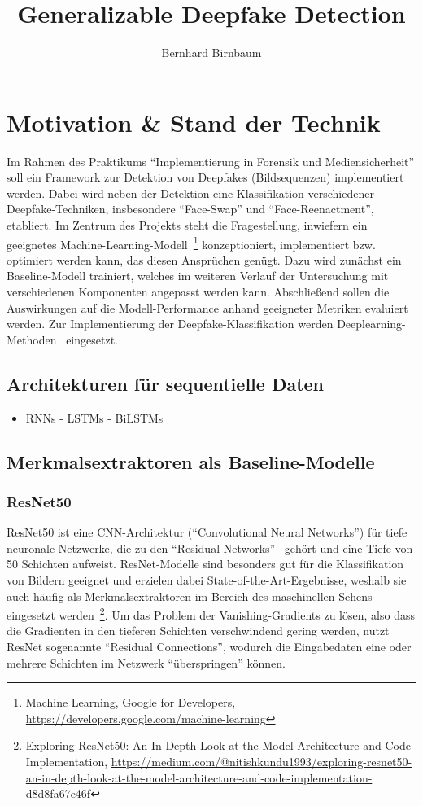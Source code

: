 \documentclass{article}
\title{Generalizable Deepfake Detection}
\author{Bernhard Birnbaum}
\begin{document}
    \maketitle

    \section{Motivation \& Stand der Technik}
    Im Rahmen des Praktikums \enquote{Implementierung in Forensik und Mediensicherheit} soll ein Framework zur Detektion von Deepfakes (Bildsequenzen) implementiert werden.
    Dabei wird neben der Detektion eine Klassifikation verschiedener Deepfake-Techniken, insbesondere \enquote{Face-Swap} und \enquote{Face-Reenactment}, etabliert.
    Im Zentrum des Projekts steht die Fragestellung, inwiefern ein geeignetes Machine-Learning-Modell~\footnote{Machine Learning, Google for Developers, \url{https://developers.google.com/machine-learning}} konzeptioniert, implementiert bzw. optimiert werden kann, das diesen Ansprüchen genügt.
    Dazu wird zunächst ein Baseline-Modell trainiert, welches im weiteren Verlauf der Untersuchung mit verschiedenen Komponenten angepasst werden kann.
    Abschließend sollen die Auswirkungen auf die Modell-Performance anhand geeigneter Metriken evaluiert werden.
    Zur Implementierung der Deepfake-Klassifikation werden Deeplearning-Methoden~\cite{deeplearningbook} eingesetzt.
    \subsection{Architekturen für sequentielle Daten}
    \begin{itemize}
        \item RNNs - LSTMs - BiLSTMs %
    \end{itemize}
    \subsection{Merkmalsextraktoren als Baseline-Modelle}
    \subsubsection{ResNet50}
    ResNet50 ist eine CNN-Architektur (\enquote{Convolutional Neural Networks}) für tiefe neuronale Netzwerke, die zu den \enquote{Residual Networks}~\cite{resnet} gehört und eine Tiefe von 50 Schichten aufweist.
    ResNet-Modelle sind besonders gut für die Klassifikation von Bildern geeignet und erzielen dabei State-of-the-Art-Ergebnisse, weshalb sie auch häufig als Merkmalsextraktoren im Bereich des maschinellen Sehens eingesetzt werden~\footnote{Exploring ResNet50: An In-Depth Look at the Model Architecture and Code Implementation, \url{https://medium.com/@nitishkundu1993/exploring-resnet50-an-in-depth-look-at-the-model-architecture-and-code-implementation-d8d8fa67e46f}}.
    Um das Problem der Vanishing-Gradients zu lösen, also dass die Gradienten in den tieferen Schichten verschwindend gering werden, nutzt ResNet sogenannte \enquote{Residual Connections}, wodurch die Eingabedaten eine oder mehrere Schichten im Netzwerk \enquote{überspringen} können.
\end{document}
